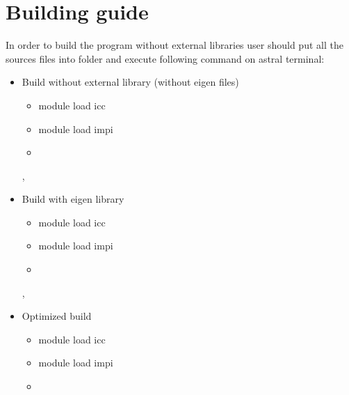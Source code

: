 \section{Building guide} 
	In order to build the program without external libraries user should put all the sources files into folder and execute following command on \gls{astral} terminal:
	
	\begin{itemize}
		\item
		{
			Build without external library (without \gls{eigen} files)
			\begin{itemize}
				\item module load icc
				\item module load impi
				\item {}
			\end{itemize}
		},
		\item
		{
			Build with \gls{eigen} library
			\begin{itemize}
				\item module load icc
				\item module load impi
				\item {}
			\end{itemize}
		},
		\item
		{
			Optimized build
			\begin{itemize}
				\item module load icc
				\item module load impi
				\item {}
			\end{itemize}
		}
	\end{itemize}
	

